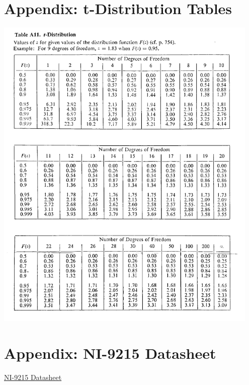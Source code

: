 \documentclass{article}
\begin{document}
\newpage
\begin{appendices}
\pagestyle{fancy}
\renewcommand{\thefigure}{A\arabic{figure}}
\setcounter{figure}{0}

\section*{Appendix: t-Distribution Tables}
\hypertarget{1}{\includegraphics[width=0.95\textwidth]{t_distribution_Table_lecture3.png}}

\section*{Appendix: NI-9215 Datasheet}
\href{https://www.amc-systeme.de/files/pdf/ni-9215-amc.pdf}{NI-9215 Datasheet}
\end{appendices}
\end{document}
